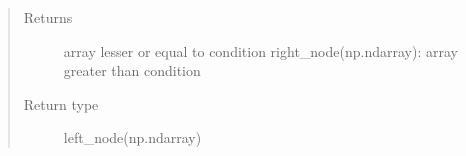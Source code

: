 \documentclass[letterpaper,10pt,english]{sphinxmanual}
\begin{document}
\begin{fulllineitems}
\begin{fulllineitems}
\begin{quote}
\begin{description}
\begin{itemize}
\end{itemize}

\item[{Returns}] \leavevmode
array lesser or equal to condition
right\_node(np.ndarray): array greater than condition

\item[{Return type}] \leavevmode
left\_node(np.ndarray)

\end{description}\end{quote}

\end{fulllineitems}


\end{fulllineitems}

\end{document}
